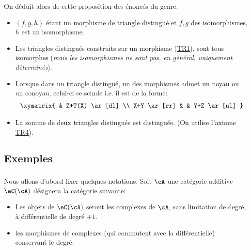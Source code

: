 On déduit alors de cette proposition des énoncés du genre: 
\begin{itemize}
  \item $(f,g,h)$ étant un morphisme de triangle distingué et $f,g$ des 
    isomorphismes, $h$ est un isomorphisme. 
  \item Les triangles distingués construits sur un morphisme 
    (\hyperlink{VIII:TR1}{TR1}), sont tous isomorphes (\emph{mais les 
    isomorphismes ne sont pas, en général, uniquement déterminés}). 
  \item Lorsque dans un triangle distingué, un des morphismes admet un noyau 
    ou un conoyau, celui-ci se scinde i.e. il est de la forme: 
    \[\xymatrix{
      & Z+T(X) \ar[dl] \\
      X+Y \ar[rr] 
        & & Y+Z \ar[ul]
    }\]
  \item La somme de deux triangles distingués est distinguée. (On utilise 
    l'axiome \hyperlink{VIII:TR4}{TR4}). 
\end{itemize}










\subsection{Exemples}\label{VIII:1-2}





\subsubsection{}\label{VIII:1-2-1}

Nous allons d'abord fixer quelques notations. Soit $\cA$ une catégorie 
additive $\eC(\cA)$ désignera la catégorie suivante: 
\begin{itemize}
  \item Les objets de $\eC(\cA)$ seront les complexes de $\cA$, sans limitation 
    de degré, à différentielle de degré $+1$. 
  \item {} les morphismes de complexes (qui 
    commutent avec la différentielle) conservant le degré. 
\end{itemize}

